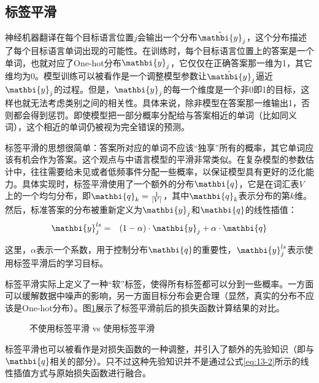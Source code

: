 \subsection{标签平滑}

\parinterval 神经机器翻译在每个目标语言位置$j$会输出一个分布$\hat{\mathbi{y}}_j$，这个分布描述了每个目标语言单词出现的可能性。在训练时，每个目标语言位置上的答案是一个单词，也就对应了One-hot分布${\mathbi{y}}_j$，它仅仅在正确答案那一维为1，其它维均为0。模型训练可以被看作是一个调整模型参数让$\hat{\mathbi{y}}_j$逼近${\mathbi{y}}_j$的过程。但是，${\mathbi{y}}_j$的每一个维度是一个非0即1的目标，这样也就无法考虑类别之间的相关性。具体来说，除非模型在答案那一维输出1，否则都会得到惩罚。即使模型把一部分概率分配给与答案相近的单词（比如同义词），这个相近的单词仍被视为完全错误的预测。

\parinterval 标签平滑的思想很简单：答案所对应的单词不应该“独享”所有的概率，其它单词应该有机会作为答案。这个观点与{\chaptertwo}中语言模型的平滑非常类似。在复杂模型的参数估计中，往往需要给未见或者低频事件分配一些概率，以保证模型具有更好的泛化能力。具体实现时，标签平滑使用了一个额外的分布$\mathbi{q}$，它是在词汇表$V$ 上的一个均匀分布，即$\mathbi{q}_k=\frac{1}{|V|}$，其中$\mathbi{q}_k$表示分布的第$k$维。然后，标准答案的分布被重新定义为${\mathbi{y}}_j$和$\mathbi{q}$的线性插值：
\begin{eqnarray}
\mathbi{y}_{j}^{ls} &=& (1-\alpha) \cdot {\mathbi{y}}_j + \alpha \cdot \mathbi{q}
\label{eq:13-5}
\end{eqnarray}

\noindent 这里，$\alpha$表示一个系数，用于控制分布$\mathbi{q}$的重要性，$\mathbi{y}_{j}^{ls}$表示使用标签平滑后的学习目标。

\parinterval 标签平滑实际上定义了一种“软”标签，使得所有标签都可以分到一些概率。一方面可以缓解数据中噪声的影响，另一方面目标分布会更合理（显然，真实的分布不应该是One-hot分布）。图\ref{fig:13-5}展示了标签平滑前后的损失函数计算结果的对比。

\begin{figure}[htp]
\centering

\caption{不使用标签平滑 vs 使用标签平滑}
\label{fig:13-5}
\end{figure}

\parinterval 标签平滑也可以被看作是对损失函数的一种调整，并引入了额外的先验知识（即与$\mathbi{q}$相关的部分）。只不过这种先验知识并不是通过公式\eqref{eq:13-2}所示的线性插值方式与原始损失函数进行融合。

